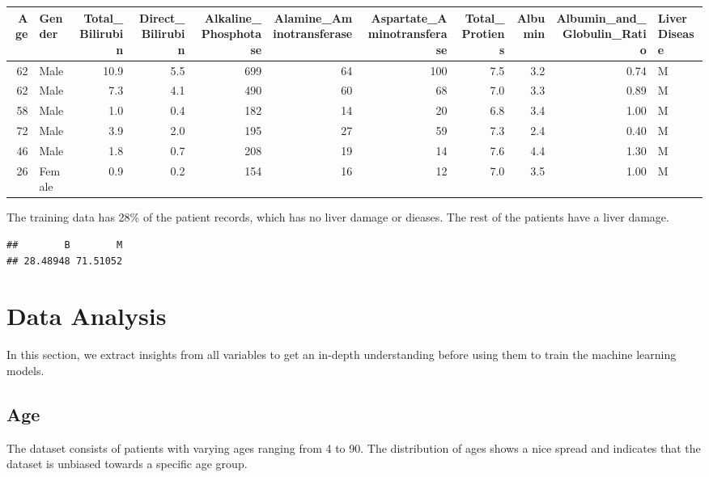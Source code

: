 \documentclass[]{article}
\newenvironment{Shaded}{\begin{snugshade}}{\end{snugshade}}
\newcommand{\FloatTok}[1]{\textcolor[rgb]{0.00,0.00,0.81}{#1}}
\newcommand{\KeywordTok}[1]{\textcolor[rgb]{0.13,0.29,0.53}{\textbf{#1}}}
\newcommand{\NormalTok}[1]{#1}
\newcommand{\OperatorTok}[1]{\textcolor[rgb]{0.81,0.36,0.00}{\textbf{#1}}}
\newcommand{\StringTok}[1]{\textcolor[rgb]{0.31,0.60,0.02}{#1}}
\begin{document}
\begin{longtable}[]{@{}rlrrrrrrrrl@{}}
\toprule
Age & Gender & Total\_Bilirubin & Direct\_Bilirubin &
Alkaline\_Phosphotase & Alamine\_Aminotransferase &
Aspartate\_Aminotransferase & Total\_Protiens & Albumin &
Albumin\_and\_Globulin\_Ratio & LiverDisease\tabularnewline
\midrule
\endhead
62 & Male & 10.9 & 5.5 & 699 & 64 & 100 & 7.5 & 3.2 & 0.74 &
M\tabularnewline
62 & Male & 7.3 & 4.1 & 490 & 60 & 68 & 7.0 & 3.3 & 0.89 &
M\tabularnewline
58 & Male & 1.0 & 0.4 & 182 & 14 & 20 & 6.8 & 3.4 & 1.00 &
M\tabularnewline
72 & Male & 3.9 & 2.0 & 195 & 27 & 59 & 7.3 & 2.4 & 0.40 &
M\tabularnewline
46 & Male & 1.8 & 0.7 & 208 & 19 & 14 & 7.6 & 4.4 & 1.30 &
M\tabularnewline
26 & Female & 0.9 & 0.2 & 154 & 16 & 12 & 7.0 & 3.5 & 1.00 &
M\tabularnewline
\bottomrule
\end{longtable}

The training data has 28\% of the patient records, which has no liver
damage or dieases. The rest of the patients have a liver damage.

\begin{Shaded}
\end{Shaded}

\begin{verbatim}
##        B        M 
## 28.48948 71.51052
\end{verbatim}

\section{Data Analysis}
\label{sec:dataanalysis}

In this section, we extract insights from all variables to get an
in-depth understanding before using them to train the machine learning
models.

\subsection{Age}

The dataset consists of patients with varying ages ranging from 4 to 90.
The distribution of ages shows a nice spread and indicates that the
dataset is unbiased towards a specific age group.

\begin{Shaded}
\end{Shaded}
\end{document}
